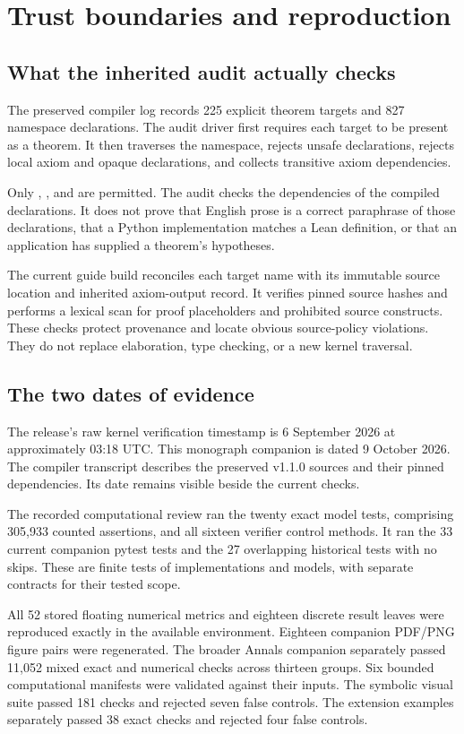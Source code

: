 \section{Trust boundaries and reproduction}
\label{sec:reproduce}
\subsection{What the inherited audit actually checks}
The preserved compiler log records 225 explicit theorem targets and 827 namespace declarations. The audit driver first requires each target to be present as a theorem. It then traverses the  namespace, rejects unsafe declarations, rejects local axiom and opaque declarations, and collects transitive axiom dependencies.

Only , , and  are permitted. The audit checks the dependencies of the compiled declarations. It does not prove that English prose is a correct paraphrase of those declarations, that a Python implementation matches a Lean definition, or that an application has supplied a theorem's hypotheses.

The current guide build reconciles each target name with its immutable source location and inherited axiom-output record. It verifies pinned source hashes and performs a lexical scan for proof placeholders and prohibited source constructs. These checks protect provenance and locate obvious source-policy violations. They do not replace elaboration, type checking, or a new kernel traversal.

\subsection{The two dates of evidence}
The release's raw kernel verification timestamp is 6 September 2026 at approximately 03:18 UTC. This monograph companion is dated 9 October 2026. The compiler transcript describes the preserved v1.1.0 sources and their pinned dependencies. Its date remains visible beside the current checks.

The recorded computational review ran the twenty exact model tests, comprising 305,933 counted assertions, and all sixteen verifier control methods. It ran the 33 current companion pytest tests and the 27 overlapping historical tests with no skips. These are finite tests of implementations and models, with separate contracts for their tested scope.

All 52 stored floating numerical metrics and eighteen discrete result leaves were reproduced exactly in the available environment. Eighteen companion PDF/PNG figure pairs were regenerated. The broader Annals companion separately passed 11,052 mixed exact and numerical checks across thirteen groups. Six bounded computational manifests were validated against their inputs. The symbolic visual suite passed 181 checks and rejected seven false controls. The extension examples separately passed 38 exact checks and rejected four false controls.

